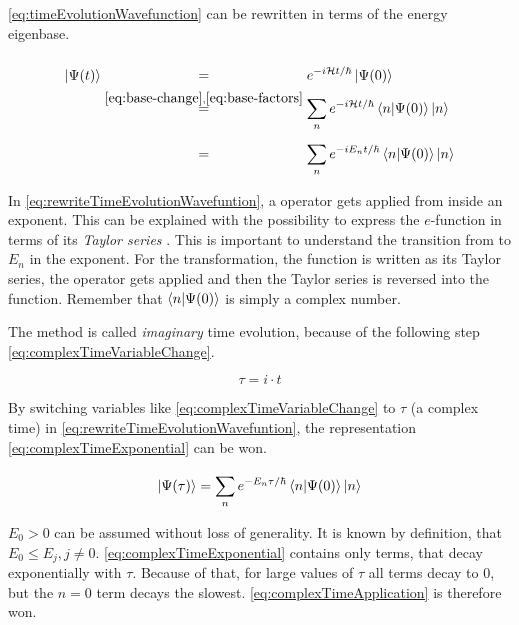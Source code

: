 \ref{eq:timeEvolutionWavefunction} can be rewritten in terms of the energy eigenbase.

\begin{equation}
    \label{eq:rewriteTimeEvolutionWavefuntion}
    \begin{split}
        \ket{\Psi(t)} &\stackrel{\phantom{\ref{eq:base-change}, \ref{eq:base-factors}}}{=} e^{-i\hamiltonian t / \hbar} \ket{\Psi(0)} \\
        &\stackrel{\ref{eq:base-change}, \ref{eq:base-factors}}{=}
        \sum\limits_{n}^{} e^{-i \hamiltonian t / \hbar} \bra{n}\ket{\Psi(0)} \ket{n}\\
        &\stackrel{\phantom{\ref{eq:base-change}, \ref{eq:base-factors}}}{=}
        \sum\limits_{n}^{} e^{-i E_n t / \hbar} \bra{n}\ket{\Psi(0)} \ket{n}
    \end{split}
\end{equation}

In \ref{eq:rewriteTimeEvolutionWavefuntion}, a operator gets applied from inside an exponent. This can be explained with the possibility to express the $e$-function in terms of its \emph{Taylor series} \cite{schwablQM}. This is important to understand the transition from \hamiltonian to $E_n$ in the exponent. For the transformation, the function is written as its Taylor series, the operator gets applied and then the Taylor series is reversed into the function. Remember that $\bra{n}\ket{\Psi(0)}$ is simply a complex number.

The method is called \emph{imaginary} time evolution, because of the following step \ref{eq:complexTimeVariableChange}.

\begin{equation}
    \label{eq:complexTimeVariableChange}
    \tau = i\cdot t
\end{equation}

By switching variables like \ref{eq:complexTimeVariableChange} to $\tau$ (a \glqq complex\grqq{} time) in \ref{eq:rewriteTimeEvolutionWavefuntion}, the representation \ref{eq:complexTimeExponential} can be won.

\begin{equation}
    \label{eq:complexTimeExponential}
    \ket{\Psi(\tau)} = \sum\limits_{n}^{} e^{-E_n \tau / \hbar} \bra{n}\ket{\Psi(0)} \ket{n}
\end{equation}

$E_0 > 0$ can be assumed without loss of generality.
It is known by definition, that $E_0 \leq E_j, j\neq 0$. 
\ref{eq:complexTimeExponential} contains only terms, that decay exponentially with $\tau$.
Because of that, for large values of $\tau$ all terms decay to 0, but the $n=0$ term decays the slowest. \ref{eq:complexTimeApplication} is therefore won.

